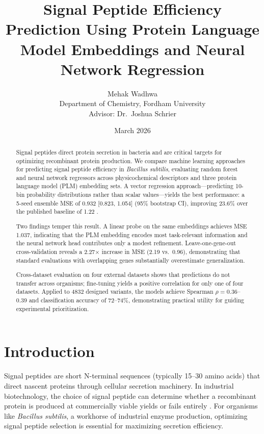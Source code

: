 \documentclass[12pt]{article}
\title{\textbf{Signal Peptide Efficiency Prediction Using Protein Language Model Embeddings and Neural Network Regression}}
\author{
  Mehak Wadhwa \\
  Department of Chemistry, Fordham University \\
  Advisor: Dr.\ Joshua Schrier
}
\date{March 2026}
\begin{document}
\maketitle

\begin{abstract}
Signal peptides direct protein secretion in bacteria and are critical targets for optimizing recombinant protein production.
We compare machine learning approaches for predicting signal peptide efficiency in \textit{Bacillus subtilis}, evaluating random forest and neural network regressors across physicochemical descriptors and three protein language model (PLM) embedding sets.
A vector regression approach---predicting 10-bin probability distributions rather than scalar values---yields the best performance: a 5-seed ensemble MSE of 0.932 [0.823, 1.054] (95\% bootstrap CI), improving 23.6\% over the published baseline of 1.22 \citep{grasso2023}.

Two findings temper this result.
A linear probe on the same embeddings achieves MSE 1.037, indicating that the PLM embedding encodes most task-relevant information and the neural network head contributes only a modest refinement.
Leave-one-gene-out cross-validation reveals a 2.27$\times$ increase in MSE (2.19 vs.\ 0.96), demonstrating that standard evaluations with overlapping genes substantially overestimate generalization.

Cross-dataset evaluation on four external datasets shows that predictions do not transfer across organisms; fine-tuning yields a positive correlation for only one of four datasets.
Applied to 4832 designed variants, the models achieve Spearman $\rho = 0.36$--0.39 and classification accuracy of 72--74\%, demonstrating practical utility for guiding experimental prioritization.
\end{abstract}

\section{Introduction}
\label{sec:intro}

Signal peptides are short N-terminal sequences (typically 15--30 amino acids) that direct nascent proteins through cellular secretion machinery.
In industrial biotechnology, the choice of signal peptide can determine whether a recombinant protein is produced at commercially viable yields or fails entirely \citep{grasso2023}.
For organisms like \textit{Bacillus subtilis}, a workhorse of industrial enzyme production, optimizing signal peptide selection is essential for maximizing secretion efficiency.
\end{document}
